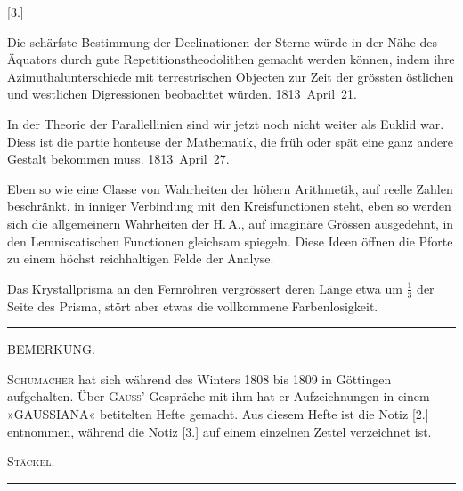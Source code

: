 \bigskip
{}
\centerline{[3.]}

\smallskip

\centerline{}

\smallskip

Die schärfste Bestimmung der Declinationen der Sterne würde in der Nähe des Äquators durch gute Repetitionstheodolithen gemacht werden können, indem ihre Azimuthalunterschiede mit terrestrischen Objecten zur Zeit der grössten östlichen und westlichen Digressionen beobachtet würden. \hfill\mbox{1813 April 21.}

\smallskip

In der Theorie der Parallellinien sind wir jetzt noch nicht weiter als Euklid war. Diess ist die partie honteuse der Mathematik, die früh oder spät eine ganz andere Gestalt bekommen muss. \hfill\mbox{1813 April 27.}

\smallskip

Eben so wie eine Classe von Wahrheiten der höhern Arithmetik, auf reelle Zahlen beschränkt, in inniger Verbindung mit den Kreisfunctionen steht, eben so werden sich die allgemeinern Wahrheiten der H.\,A., auf imaginäre Grössen ausgedehnt, in den Lemniscatischen Functionen gleichsam spiegeln. Diese Ideen öffnen die Pforte zu einem höchst reichhaltigen Felde der Analyse.

\smallskip

Das Krystallprisma an den Fernröhren vergrössert deren Länge etwa um $\frac{1}{3}$
 der Seite des Prisma, stört aber etwas die vollkommene Farbenlosigkeit.

\bigskip
\hrule
\bigskip

\centerline{BEMERKUNG.}

\smallskip

\textsc{Schumacher} hat sich während des Winters 1808 bis 1809 in Göttingen aufgehalten. Über \textsc{Gauss}’ Gespräche mit ihm hat er Aufzeichnungen in einem »GAUSSIANA« betitelten Hefte gemacht. Aus diesem Hefte ist die Notiz [2.] entnommen, während die Notiz [3.] auf einem einzelnen Zettel verzeichnet ist.
\begin{flushright}\textsc{Stäckel}.\end{flushright}

\bigskip
\hrule
